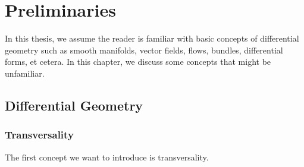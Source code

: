 \setcounter{chapter}{-1}
\chapter{Preliminaries}

In this thesis, we assume the reader is familiar with basic concepts of differential geometry such as smooth manifolds, vector fields, flows, bundles, differential forms, et cetera.
In this chapter, we discuss some concepts that might be unfamiliar.

\section*{Differential Geometry}
\subsection*{Transversality}
The first concept we want to introduce is transversality.



